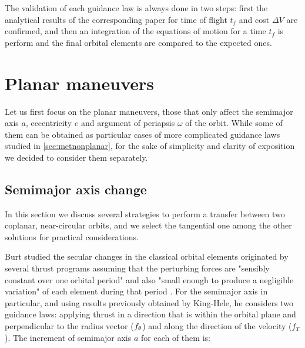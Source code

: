 The validation of each guidance law is always done in two steps: first the analytical results of the corresponding paper for time of flight $t_f$ and cost $\Delta V$ are confirmed, and then an integration of the equations of motion for a time $t_f$ is perform and the final orbital elements are compared to the expected ones.

\section{Planar maneuvers} \label{sec:metplanar}

Let us first focus on the planar maneuvers, those that only affect the semimajor axis $a$, eccentricity $e$ and argument of periapsis $\omega$ of the orbit. While some of them can be obtained as particular cases of more complicated guidance laws studied in \ref{sec:metnonplanar}, for the sake of simplicity and clarity of exposition we decided to consider them separately.
% 
% 
%
%

\subsection{Semimajor axis change} \label{sec:metsma}

In this section we discuss several strategies to perform a transfer between two coplanar, near-circular orbits, and we select the tangential one among the other solutions for practical considerations.
% 
% 

Burt studied the secular changes in the classical orbital elements originated by several thrust programs assuming that the perturbing forces are "sensibly constant over one orbital period" and also "small enough to produce a negligible variation" of each element during that period \cite{burt1967space}. For the semimajor axis in particular, and using results previously obtained by King-Hele, he considers two guidance laws: applying thrust in a direction that is within the orbital plane and perpendicular to the radius vector ($f_{\theta}$) and along the direction of the velocity ($f_T$). The increment of semimajor axis $a$ for each of them is:

